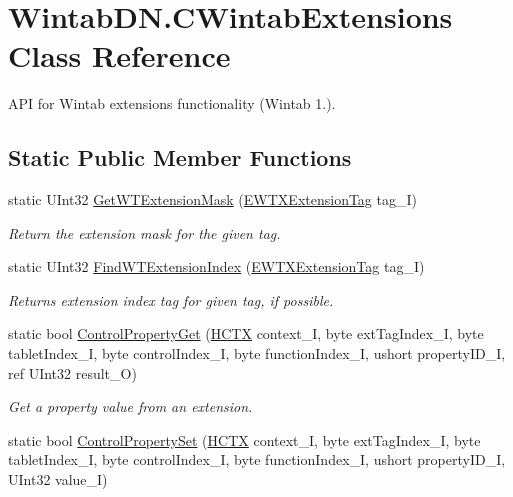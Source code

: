 \hypertarget{class_wintab_d_n_1_1_c_wintab_extensions}{}\section{Wintab\+D\+N.\+C\+Wintab\+Extensions Class Reference}
\label{class_wintab_d_n_1_1_c_wintab_extensions}


A\+PI for Wintab extensions functionality (Wintab 1.).  


\subsection*{Static Public Member Functions}
\begin{DoxyCompactItemize}
\item 
static U\+Int32 \mbox{\hyperlink{class_wintab_d_n_1_1_c_wintab_extensions_ab68b335cdc5010dab82f1941d39fea67}{Get\+W\+T\+Extension\+Mask}} (\mbox{\hyperlink{namespace_wintab_d_n_a303ef868b8887dc43872ddac8a7d059b}{E\+W\+T\+X\+Extension\+Tag}} tag\+\_\+I)
\begin{DoxyCompactList}\small\item\em Return the extension mask for the given tag. \end{DoxyCompactList}\item 
static U\+Int32 \mbox{\hyperlink{class_wintab_d_n_1_1_c_wintab_extensions_a1677bed45e60d70b5fa2a14b381851d7}{Find\+W\+T\+Extension\+Index}} (\mbox{\hyperlink{namespace_wintab_d_n_a303ef868b8887dc43872ddac8a7d059b}{E\+W\+T\+X\+Extension\+Tag}} tag\+\_\+I)
\begin{DoxyCompactList}\small\item\em Returns extension index tag for given tag, if possible. \end{DoxyCompactList}\item 
static bool \mbox{\hyperlink{class_wintab_d_n_1_1_c_wintab_extensions_ac81f1953072b1c812e2602c835813cbe}{Control\+Property\+Get}} (\mbox{\hyperlink{class_wintab_d_n_1_1_h_c_t_x}{H\+C\+TX}} context\+\_\+I, byte ext\+Tag\+Index\+\_\+I, byte tablet\+Index\+\_\+I, byte control\+Index\+\_\+I, byte function\+Index\+\_\+I, ushort property\+I\+D\+\_\+I, ref U\+Int32 result\+\_\+O)
\begin{DoxyCompactList}\small\item\em Get a property value from an extension. \end{DoxyCompactList}\item 
static bool \mbox{\hyperlink{class_wintab_d_n_1_1_c_wintab_extensions_a8e0839db892d1ea0a1a3c6acefd972f9}{Control\+Property\+Set}} (\mbox{\hyperlink{class_wintab_d_n_1_1_h_c_t_x}{H\+C\+TX}} context\+\_\+I, byte ext\+Tag\+Index\+\_\+I, byte tablet\+Index\+\_\+I, byte control\+Index\+\_\+I, byte function\+Index\+\_\+I, ushort property\+I\+D\+\_\+I, U\+Int32 value\+\_\+I)

\end{DoxyCompactItemize}
